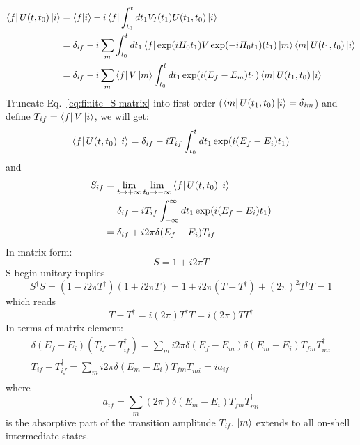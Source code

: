 \begin{equation}
    \begin{aligned}
	\bra{f} U(t, t_0) \ket{i} 
	&= \bra{f}\ket{i} - i \bra{f} \int_{t_0}^t dt_1 V_I(t_1) U(t_1, t_0) \ket{i}	\\
	&= \delta_{if} - i\sum_m \int_{t_0}^t dt_1 \bra{f}\exp(iH_0 t_1) V \exp(-iH_0 t_1)(t_1)\ket{m} \bra{m} U(t_1, t_0) \ket{i} \\
	&= \delta_{if} - i\sum_m \bra{f}V\ket{m} \int_{t_0}^t dt_1 \exp(i(E_f - E_m)t_1) \bra{m}U(t_1, t_0)\ket{i}  \\
    \end{aligned}
    \label{eq:finite_S-matrix}
\end{equation}
Truncate Eq.~\ref{eq:finite_S-matrix} into first order ($\bra{m} U(t_1, t_0) \ket{i} = \delta_{im}$)
and define $T_{if} = \bra{f} V \ket{i}$, we will get:
\begin{equation}
    \bra{f} U(t, t_0) \ket{i} = \delta_{if} - iT_{if} \int_{t_0}^t dt_1 \exp(i(E_f - E_i)t_1)
\end{equation}
and 
\begin{equation}
    \begin{aligned}
	S_{if} &= \lim_{t\rightarrow +\infty}\lim_{t_0 \rightarrow -\infty} \bra{f} U(t, t_0) \ket{i}    \\
	    &= \delta_{if} - iT_{if} \int_{-\infty}^{\infty} dt_1 \exp(i(E_f - E_i)t_1)	\\
	    &= \delta_{if} + i2\pi\delta(E_f - E_i)T_{if}   \\
    \end{aligned}
\end{equation}
In matrix form:
\begin{equation}
    S = 1 + i2\pi T
\end{equation}
S begin unitary implies
\begin{equation}
    S^\dag S = (1 - i2\pi T^\dag) (1 + i2\pi T) = 1 + i2\pi(T - T^\dag) + (2\pi)^2 T^\dag T = 1
\end{equation}
which reads
\begin{equation}
    T - T^\dag = i (2\pi)T^\dag T = i(2\pi) T T^\dag
\end{equation}
In terms of matrix element:
\begin{equation}
    \begin{gathered}
    \delta(E_f - E_i)(T_{if} - T^\dag_{if}) = \sum_m i2\pi\delta(E_f - E_m)\delta(E_m - E_i)T_{fm}T^\dag_{mi}	\\
    T_{if} - T^\dag_{if} = \sum_m i2\pi\delta(E_m - E_i)T_{fm}T^\dag_{mi} = ia_{if} \\
    \end{gathered}
\end{equation}
where 
\begin{equation}
    a_{if} = \sum_m (2\pi) \delta(E_m - E_i)T_{fm}T^\dag_{mi}
\end{equation}
is the absorptive part of the transition amplitude $T_{if}$. $\ket{m}$ extends
to all on-shell intermediate states.

